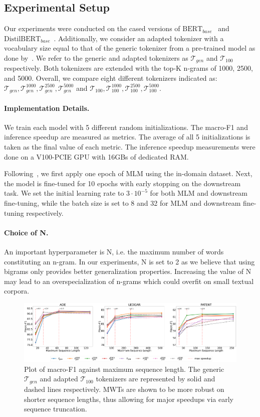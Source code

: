 \documentclass[11pt]{article}
\def\tokgen{\mathcal{T}_{gen}}
\def\tok100{\mathcal{T}_{100}}
\begin{document}
\subsection{Experimental Setup}
Our experiments were conducted on the cased versions of $\text{BERT}_{base}$~\citep{BERT} and $\text{DistilBERT}_{base}$~\citep{DistilBERT}. Additionally, we consider an adapted tokenizer with a vocabulary size equal to that of the generic tokenizer from a pre-trained model as done by~\citet{FVT}. We refer to the generic and adapted tokenizers as $\tokgen$ and $\tok100$ respectively. Both tokenizers are extended with the top-K n-grams of 1000, 2500, and 5000. Overall, we compare eight different tokenizers indicated as: $\tokgen, \tokgen^{1000}, \tokgen^{2500}, \tokgen^{5000}$ and $\tok100, \tok100^{1000}, \tok100^{2500}, \tok100^{5000}$.

\paragraph{Implementation Details.}
We train each model with 5 different random initializations. The macro-F1 and inference speedup are measured as metrics. The average of all 5 initializations is taken as the final value of each metric. The inference speedup measurements were done on a \mbox{V100-PCIE} GPU with 16GBs of dedicated RAM.

Following~\citet{FVT}, we first apply one epoch of MLM using the in-domain dataset. Next, the model is fine-tuned for 10 epochs with early stopping on the downstream task. We set the initial learning rate to $3\cdot10^{-5}$ for both MLM and downstream fine-tuning, while the batch size is set to 8 and 32 for MLM and downstream fine-tuning respectively.

\paragraph{Choice of N.}
An important hyperparameter is N, i.e. the maximum number of words constituting an n-gram. In our experiments, N is set to 2 as we believe that using bigrams only provides better generalization properties. Increasing the value of N may lead to an overspecialization of n-grams which could overfit on small textual corpora.

\begin{figure}[ht]
    \centering
    \includegraphics[scale=0.13]{images/accuracy.pdf}
    \caption{Plot of macro-F1 against maximum sequence length. The generic $\tokgen$ and adapted $\tok100$ tokenizers are represented by solid and dashed lines respectively. MWTs are shown to be more robust on shorter sequence lengths, thus allowing for major speedups via early sequence truncation.} 
    \label{figure:results}
\end{figure}
\end{document}

